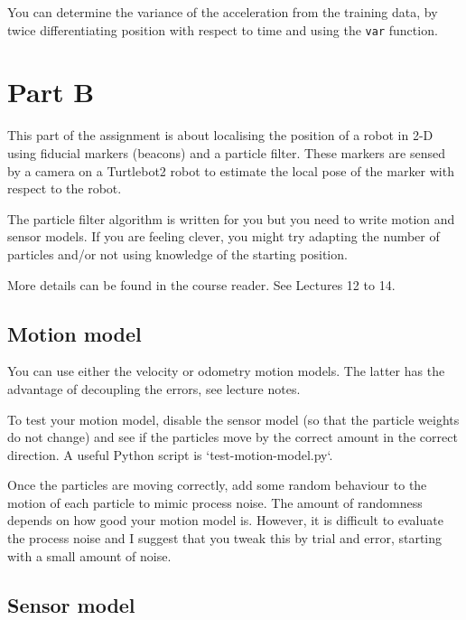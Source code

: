 \documentclass[a4paper, 12pt]{article}
\newcommand{\code}[1]{\texttt{#1}}
\begin{document}
You can determine the variance of the acceleration from the training
data, by twice differentiating position with respect to time and using
the \code{var} function.


\section{Part B}

This part of the assignment is about localising the position of a
robot in 2-D using fiducial markers (beacons) and a particle filter.
These markers are sensed by a camera on a Turtlebot2 robot to estimate
the local pose of the marker with respect to the robot.

The particle filter algorithm is written for you but you need to write
motion and sensor models.  If you are feeling clever, you might try
adapting the number of particles and/or not using knowledge of the
starting position.

More details can be found in the course reader.  See Lectures 12 to
14.


\subsection{Motion model}

You can use either the velocity or odometry motion models.  The latter
has the advantage of decoupling the errors, see lecture notes.

To test your motion model, disable the sensor model (so that the
particle weights do not change) and see if the particles move by the
correct amount in the correct direction.  A useful Python script is
`test-motion-model.py`.

Once the particles are moving correctly, add some random behaviour to
the motion of each particle to mimic process noise.  The amount of
randomness depends on how good your motion model is.  However, it is
difficult to evaluate the process noise and I suggest that you tweak
this by trial and error, starting with a small amount of noise.


\subsection{Sensor model}
\end{document}
